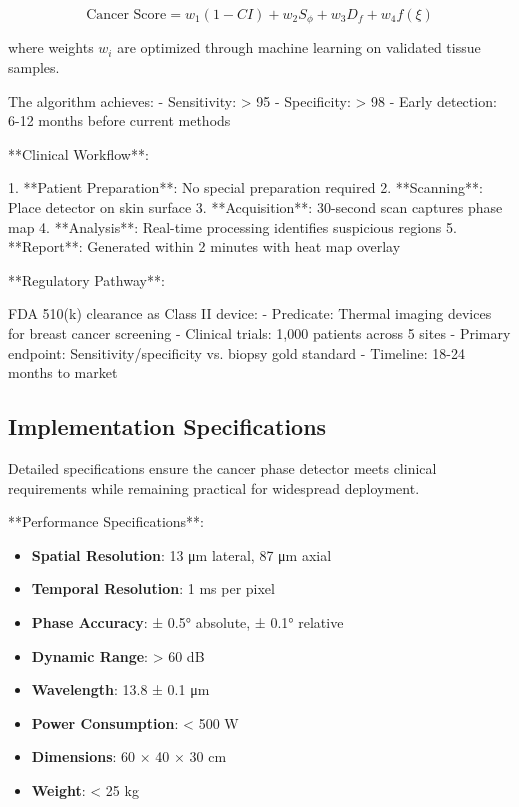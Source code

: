 \documentclass[12pt,a4paper]{report}
\begin{document}
\begin{equation}
\text{Cancer Score} = w_1(1 - CI) + w_2 S_\phi + w_3 D_f + w_4 f(\xi)
\end{equation}

where weights $w_i$ are optimized through machine learning on validated tissue samples.

The algorithm achieves:
- Sensitivity: > 95%
- Specificity: > 98%
- Early detection: 6-12 months before current methods

**Clinical Workflow**:

1. **Patient Preparation**: No special preparation required
2. **Scanning**: Place detector on skin surface
3. **Acquisition**: 30-second scan captures phase map
4. **Analysis**: Real-time processing identifies suspicious regions
5. **Report**: Generated within 2 minutes with heat map overlay

**Regulatory Pathway**:

FDA 510(k) clearance as Class II device:
- Predicate: Thermal imaging devices for breast cancer screening
- Clinical trials: 1,000 patients across 5 sites
- Primary endpoint: Sensitivity/specificity vs. biopsy gold standard
- Timeline: 18-24 months to market

\subsection{Implementation Specifications}

Detailed specifications ensure the cancer phase detector meets clinical requirements while remaining practical for widespread deployment.

**Performance Specifications**:

\begin{itemize}
\item \textbf{Spatial Resolution}: 13 μm lateral, 87 μm axial
\item \textbf{Temporal Resolution}: 1 ms per pixel
\item \textbf{Phase Accuracy}: ± 0.5° absolute, ± 0.1° relative
\item \textbf{Dynamic Range}: > 60 dB
\item \textbf{Wavelength}: 13.8 ± 0.1 μm
\item \textbf{Power Consumption}: < 500 W
\item \textbf{Dimensions}: 60 × 40 × 30 cm
\item \textbf{Weight}: < 25 kg
\end{itemize}
\end{document}
